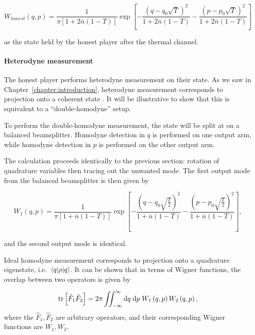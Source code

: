 \begin{equation}
W_{honest}\left(q, p\right) = \frac{1}{\pi \left[ 1 + 2 \bar{n} \left(1-T\right)\right]} \exp\left[ - \frac{\left(q - q_0 \sqrt{T}\right)^2}{1 + 2 \bar{n}\left(1-T\right)} - \frac{\left(p - p_0 \sqrt{T}\right)^2}{1 + 2 \bar{n} \left(1-T\right)} \right]
\end{equation}

\noindent as the state held by the honest player after the thermal channel.

\paragraph{Heterodyne measurement}

The honest player performs heterodyne measurement on their state. As we saw in Chapter~\ref{chapter:introduction}, heterodyne measurement corresponds to projection onto a coherent state \cite{Serafini2018, Weedbrook2012}. It will be illustrative to show that this is equivalent to a ``double-homodyne'' setup.

To perform the double-homodyne measurement, the state will be split at on a balanced beamsplitter. Homodyne detection in $q$ is performed on one output arm, while homodyne detection in $p$ is performed on the other output arm.

The calculation proceeds identically to the previous section: rotation of quadrature variables then tracing out the unwanted mode. The first output mode from the balanced beamsplitter is then given by

\begin{equation}
W_1\left(q, p\right) =  \frac{1}{\pi \left[ 1 + \bar{n}\left(1-T\right)\right]} \exp\left[- \frac{\left(q - q_0 \sqrt{\frac{T}{2}}\right)^2}{1 + \bar{n}\left(1-T\right)} - \frac{\left(p - p_0 \sqrt{\frac{T}{2}}\right)^2}{1 + \bar{n}\left(1-T\right)} \right],
\end{equation}

\noindent and the second output mode is identical.

Ideal homodyne measurement corresponds to projection onto a quadrature eigenstate, i.e. $\mel{q}{\rho}{q}$. It can be shown \cite{Leonhardt2010} that in terms of Wigner functions, the overlap between two operators is given by

\begin{equation}
\tr\left[\hat{F}_1 \hat{F}_2 \right] = 2 \pi \iint_{-\infty}^\infty \mathrm{d}q \; \mathrm{d}p \; W_1\left(q, p\right) W_2\left(q, p\right),
\end{equation}
where the $\hat{F}_1, \hat{F}_2$ are arbitrary operators, and their corresponding Wigner functions are $W_1, W_2$.

